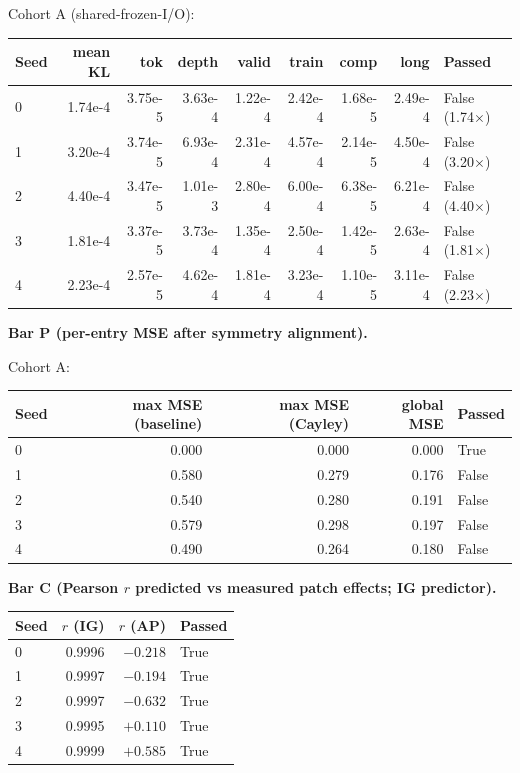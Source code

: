 \documentclass[11pt,letterpaper]{article}
\begin{document}
Cohort A (shared-frozen-I/O):

\begin{center}
\small
\begin{tabular}{lrrrrrrrl}
\toprule
Seed & mean KL & tok & depth & valid & train & comp & long & Passed \\
\midrule
0 & 1.74e-4 & 3.75e-5 & 3.63e-4 & 1.22e-4 & 2.42e-4 & 1.68e-5 & 2.49e-4 & False (1.74$\times$) \\
1 & 3.20e-4 & 3.74e-5 & 6.93e-4 & 2.31e-4 & 4.57e-4 & 2.14e-5 & 4.50e-4 & False (3.20$\times$) \\
2 & 4.40e-4 & 3.47e-5 & 1.01e-3 & 2.80e-4 & 6.00e-4 & 6.38e-5 & 6.21e-4 & False (4.40$\times$) \\
3 & 1.81e-4 & 3.37e-5 & 3.73e-4 & 1.35e-4 & 2.50e-4 & 1.42e-5 & 2.63e-4 & False (1.81$\times$) \\
4 & 2.23e-4 & 2.57e-5 & 4.62e-4 & 1.81e-4 & 3.23e-4 & 1.10e-5 & 3.11e-4 & False (2.23$\times$) \\
\bottomrule
\end{tabular}
\end{center}

\textbf{Bar P (per-entry MSE after symmetry alignment).}

Cohort A:

\begin{center}
\begin{tabular}{lrrrl}
\toprule
Seed & max MSE (baseline) & max MSE (Cayley) & global MSE & Passed \\
\midrule
0 & 0.000 & 0.000 & 0.000 & True \\
1 & 0.580 & 0.279 & 0.176 & False \\
2 & 0.540 & 0.280 & 0.191 & False \\
3 & 0.579 & 0.298 & 0.197 & False \\
4 & 0.490 & 0.264 & 0.180 & False \\
\bottomrule
\end{tabular}
\end{center}

\textbf{Bar C (Pearson $r$ predicted vs measured patch effects; IG predictor).}

\begin{center}
\begin{tabular}{lrrl}
\toprule
Seed & $r$ (IG) & $r$ (AP) & Passed \\
\midrule
0 & 0.9996 & $-0.218$ & True \\
1 & 0.9997 & $-0.194$ & True \\
2 & 0.9997 & $-0.632$ & True \\
3 & 0.9995 & $+0.110$ & True \\
4 & 0.9999 & $+0.585$ & True \\
\bottomrule
\end{tabular}
\end{center}
\end{document}
